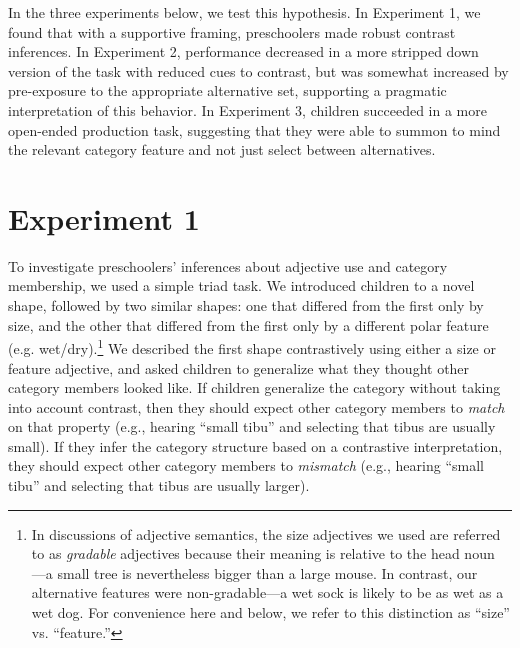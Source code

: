 \documentclass[man]{apa2}
\begin{document}
In the three experiments below, we test this hypothesis. In Experiment 1, we found that with a supportive framing, preschoolers made robust contrast inferences.  In Experiment 2, performance decreased in a more stripped down version of the task with reduced cues to contrast, but was somewhat increased by pre-exposure to the appropriate alternative set, supporting a pragmatic interpretation of this behavior. In Experiment 3, children succeeded in a more open-ended production task, suggesting that they were able to summon to mind the relevant category feature and not just select between alternatives.

\section{Experiment 1}

To investigate preschoolers' inferences about adjective use and category membership, we used a simple triad task.  We introduced children to a novel shape, followed by two similar shapes: one that differed from the first only by size, and the other that differed from the first only by a different polar feature (e.g. wet/dry).\footnote{In discussions of adjective semantics, the size adjectives we used are referred to as \emph{gradable} adjectives because their meaning is relative to the head noun \cite{kennedy2012}---a small tree is nevertheless bigger than a large mouse. In contrast, our alternative features were non-gradable---a wet sock is likely to be as wet as a wet dog. For convenience here and below, we refer to this distinction as ``size'' vs. ``feature.''} We described the first shape contrastively using either a size or feature adjective, and asked children to generalize what they thought other category members looked like. If children generalize the category without taking into account contrast, then they should expect other category members to \emph{match} on that property  (e.g., hearing ``small tibu'' and selecting that tibus are usually small). If they infer the category structure based on a contrastive interpretation, they should expect other category members to \emph{mismatch} (e.g., hearing ``small tibu'' and selecting that tibus are usually larger). 

\end{document}
